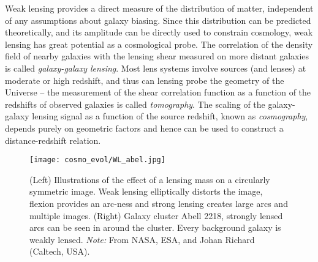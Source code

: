 Weak lensing provides a direct measure of the distribution of matter, independent of any assumptions about galaxy biasing. Since this distribution can be predicted theoretically, and its amplitude can be directly used to constrain cosmology, weak lensing has great potential as a cosmological probe. The correlation of the density field of nearby galaxies with the lensing shear measured on more distant galaxies is called \textit{galaxy-galaxy lensing}. Most lens systems involve sources (and lenses) at moderate or high redshift, and thus can lensing probe the geometry of the Universe -- the measurement of the shear correlation function as a function of the redshifts of observed galaxies is called \textit{tomography}. The scaling of the galaxy-galaxy lensing signal as a function of the source redshift, known as \textit{cosmography}, depends purely on geometric factors and hence can be used to construct a distance-redshift relation.
\begin{figure}
	\centering
		\texttt{[image: cosmo\_evol/WL\_abel.jpg]}
	\caption{(Left) Illustrations of the effect of a lensing mass on a circularly symmetric image. Weak lensing elliptically distorts the image, flexion provides an arc-ness and strong lensing creates large arcs and multiple images. (Right) Galaxy cluster Abell 2218, strongly lensed arcs can be seen in around the cluster. Every background galaxy is weakly lensed. \textit{Note:} From NASA, ESA, and Johan Richard (Caltech, USA).}
	\label{fig_WL_Abell}
\end{figure}
